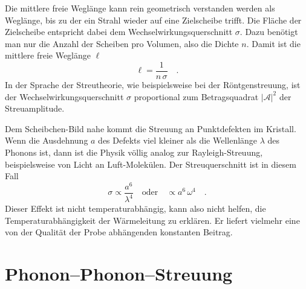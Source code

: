 Die mittlere freie Weglänge kann rein geometrisch verstanden werden als Weglänge, bis zu der ein Strahl wieder auf eine Zielscheibe trifft. Die Fläche der Zielscheibe entspricht dabei dem Wechselwirkungsquerschnitt $\sigma$. Dazu benötigt man nur die Anzahl der Scheiben pro Volumen, also die Dichte $n$. Damit ist die mittlere freie Weglänge $\ell$
\begin{equation}
    \ell = \frac{1}{n \, \sigma} \quad .  \label{eq:1_def_weglaenge} 
\end{equation}
In der Sprache der Streutheorie, wie beispielsweise bei der Röntgenstreuung, ist der Wechselwirkungsquerschnitt $\sigma$ proportional zum Betragsquadrat $|\mathcal{A}|^2$ der Streuamplitude.

Dem Scheibchen-Bild nahe kommt die Streuung an Punktdefekten im Kristall. Wenn die Ausdehnung $a$ des Defekts viel kleiner als die Wellenlänge $\lambda$ des Phonons ist, dann ist die Physik völlig analog zur Rayleigh-Streuung, beispielsweise von Licht an Luft-Molekülen. Der Streuquerschnitt ist in diesem Fall
\begin{equation}
    \sigma \propto \frac{a^6}{\lambda^4} \quad \text{oder} \quad \propto a^6 \, \omega^4 \quad .
\end{equation}
Dieser Effekt ist nicht temperaturabhängig, kann also nicht helfen, die Temperaturabhängigkeit der Wärmeleitung zu erklären. Er liefert vielmehr eine von der Qualität der Probe abhängenden konstanten Beitrag.



\section{Phonon--Phonon--Streuung}



